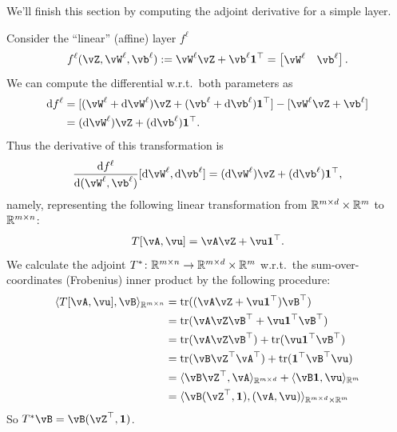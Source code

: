 \documentclass[../../book-main.tex]{subfiles}
\begin{document}
We'll finish this section by computing the adjoint derivative for a simple layer.
\begin{example}
    Consider the ``linear'' (affine) layer \(f^{\ell}\)
    \begin{equation}
        f^{\ell}(\vZ, \vW^{\ell}, \vb^{\ell}) := \vW^{\ell}\vZ + \vb^{\ell}\vone^{\top} = \mat{\vW^{\ell} & \vb^{\ell}}.
    \end{equation}
    We can compute the differential w.r.t.~both parameters as
    \begin{align}
        \odif{f}^{\ell}
        &= [(\vW^{\ell} + \odif{\vW}^{\ell})\vZ + (\vb^{\ell} + \odif{\vb}^{\ell})\vone^{\top}] - [\vW^{\ell}\vZ + \vb^{\ell}] \\ 
        &= (\odif{\vW}^{\ell})\vZ + (\odif{\vb}^{\ell})\vone^{\top}.
    \end{align}
    Thus the derivative of this transformation is 
    \begin{equation}
        \odv{f^{\ell}}{(\vW^{\ell}, \vb^{\ell})}[\odif{\vW}^{\ell}, \odif{\vb}^{\ell}] = (\odif{\vW}^{\ell})\vZ + (\odif{\vb}^{\ell})\vone^{\top},
    \end{equation}
    namely, representing the following linear transformation from \(\mathbb{R}^{m \times d} \times \mathbb{R}^{m}\) to \(\mathbb{R}^{m \times n}\):
    \begin{equation}
        T[\vA, \vu] = \vA\vZ + \vu\vone^{\top}.
    \end{equation}
    We calculate the adjoint \(T^{*} \colon \mathbb{R}^{m \times n} \to \mathbb{R}^{m \times d} \times \mathbb{R}^{m}\) w.r.t.~the sum-over-coordinates (Frobenius) inner product by the following procedure:
    \begin{align}
        \ip{T[\vA, \vu]}{\vB}_{\R^{m \times n}} 
        &= \tr((\vA\vZ + \vu\vone^{\top})\vB^{\top}) \\
        &= \tr(\vA\vZ\vB^{\top} + \vu\vone^{\top}\vB^{\top}) \\
        &= \tr(\vA\vZ\vB^{\top}) + \tr(\vu\vone^{\top}\vB^{\top}) \\
        &= \tr(\vB\vZ^{\top}\vA^{\top}) + \tr(\vone^{\top}\vB^{\top}\vu) \\
        &= \ip{\vB\vZ^{\top}}{\vA}_{\R^{m \times d}} + \ip{\vB\vone}{\vu}_{\R^{m}} \\
        &= \ip{\vB(\vZ^{\top}, \vone)}{(\vA, \vu)}_{\R^{m \times d} \times \R^{m}}
    \end{align}
    So \(T^{*}\vB = \vB(\vZ^{\top}, \vone)\).
\end{example}
\end{document}
